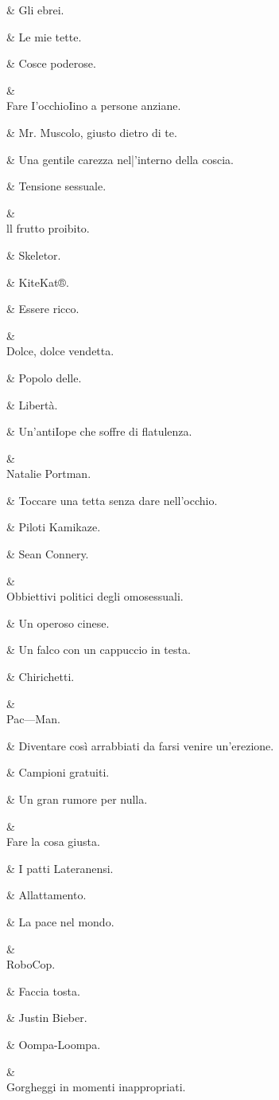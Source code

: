 &
Gli ebrei.

&
Le mie tette.

&
Cosce poderose.

&
\\
Fare I’occhioIino
a persone
anziane.

&
Mr. Muscolo,
giusto dietro di
te.

&
Una gentile
carezza
nel|’interno della
coscia.

&
Tensione
sessuale.

&
\\
ll frutto proibito.

&
Skeletor.

&
KiteKat®.

&
Essere ricco.

&
\\
Dolce, dolce
vendetta.

&
Popolo delle.

&
Libertà.

&
Un’antiIope
che soffre di
flatulenza.

&
\\
Natalie Portman.

&
Toccare una
tetta senza dare
nell’occhio.

&
Piloti Kamikaze.

&
Sean Connery.

&
\\
Obbiettivi
politici degli
omosessuali.

&
Un operoso
cinese.

&
Un falco con un
cappuccio in
testa.

&
Chirichetti.

&
\\
Pac—Man.

&
Diventare così
arrabbiati da
farsi venire
un’erezione.

&
Campioni
gratuiti.

&
Un gran rumore
per nulla.

&
\\
Fare la cosa
giusta.

&
I patti
Lateranensi.

&
Allattamento.

&
La pace nel
mondo.

&
\\
RoboCop.

&
Faccia tosta.

&
Justin Bieber.

&
Oompa-Loompa.

&
\\
Gorgheggi
in momenti
inappropriati.

